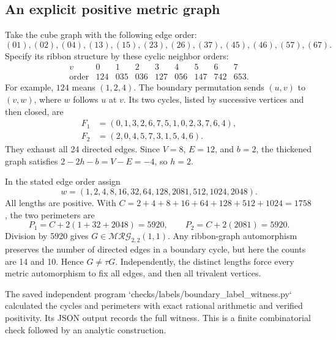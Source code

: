 \documentclass[10pt]{article}
\begin{document}
\subsection*{An explicit positive metric graph}
Take the cube graph with the following edge order: \[(01),(02),(04),(13),(15),(23),(26),(37),(45),(46),(57),(67).\] Specify its ribbon structure by these cyclic neighbor orders: \[\begin{array}{c|cccccccc}
v&0&1&2&3&4&5&6&7\\ \hline
\text{order}&124&035&036&127&056&147&742&653 .
\end{array}\] For example, \(124\) means \((1,2,4)\). The boundary permutation sends \((u,v)\) to \((v,w)\), where \(w\) follows \(u\) at \(v\). Its two cycles, listed by successive vertices and then closed, are \[\begin{split}
 F_1&=(0,1,3,2,6,7,5,1,0,2,3,7,6,4),\\
 F_2&=(2,0,4,5,7,3,1,5,4,6).
\end{split}\] They exhaust all 24 directed edges. Since \(V=8\), \(E=12\), and \(b=2\), the thickened graph satisfies \(2-2h-b=V-E=-4\), so \(h=2\).\par
In the stated edge order assign \[w=(1,2,4,8,16,32,64,128,2081,512,1024,2048).\] All lengths are positive. With \(C=2+4+8+16+64+128+512+1024=1758\), the two perimeters are \[P_1=C+2(1+32+2048)=5920,\qquad
 P_2=C+2(2081)=5920.\] Division by 5920 gives \(G\in\mathcal{MRG}_{2,2}(1,1)\). Any ribbon-graph automorphism preserves the number of directed edges in a boundary cycle, but here the counts are 14 and 10. Hence \(G\ne\tau G\). Independently, the distinct lengths force every metric automorphism to fix all edges, and then all trivalent vertices.\par
The saved independent program `checks/labels/boundary\_label\_witness.py` calculated the cycles and perimeters with exact rational arithmetic and verified positivity. Its JSON output records the full witness. This is a finite combinatorial check followed by an analytic construction.\par
\end{document}
